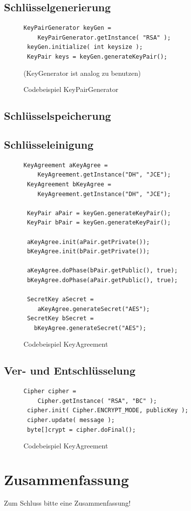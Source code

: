 \documentclass[paper=a4,11pt,german]{scrartcl} %
\begin{document}
\subsection{Schlüsselgenerierung}
\begin{figure}[hbtp]
\caption{Codebeispiel KeyPairGenerator}
\begin{lstlisting}[frame=shadowbox]
 KeyPairGenerator keyGen = 
 	KeyPairGenerator.getInstance( "RSA" );
 keyGen.initialize( int keysize );
 KeyPair keys = keyGen.generateKeyPair();
\end{lstlisting}
(KeyGenerator ist analog zu benutzen)
\label{KeyPairGen}
\end{figure}

\subsection{Schlüsselspeicherung}

\subsection{Schlüsseleinigung}
\begin{figure}[hbtp]
\caption{Codebeispiel KeyAgreement}
\begin{lstlisting}[frame=shadowbox]
 KeyAgreement aKeyAgree =
  	KeyAgreement.getInstance("DH", "JCE");
 KeyAgreement bKeyAgree = 
  	KeyAgreement.getInstance("DH", "JCE");
   
 KeyPair aPair = keyGen.generateKeyPair();
 KeyPair bPair = keyGen.generateKeyPair();
 
 aKeyAgree.init(aPair.getPrivate());
 bKeyAgree.init(bPair.getPrivate());
 
 aKeyAgree.doPhase(bPair.getPublic(), true);
 bKeyAgree.doPhase(aPair.getPublic(), true);

 SecretKey aSecret =
   	aKeyAgree.generateSecret("AES");
 SecretKey bSecret =
   bKeyAgree.generateSecret("AES");
\end{lstlisting}
\label{KeyAgree}
\end{figure}

\subsection{Ver- und Entschlüsselung}
\begin{figure}[hbtp]
\caption{Codebeispiel KeyAgreement}
\begin{lstlisting}[frame=shadowbox]
 Cipher cipher = 
 	Cipher.getInstance( "RSA", "BC" );
 cipher.init( Cipher.ENCRYPT_MODE, publicKey );
 cipher.update( message );
 byte[]crypt = cipher.doFinal();
\end{lstlisting}
\label{encrypt}
\end{figure}

\section{Zusammenfassung}
Zum Schluss bitte eine Zusammenfassung!



\end{document}
